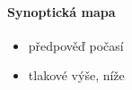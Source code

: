 \paragraph{Synoptická mapa}
\begin{itemize}
\item předpověď počasí
\item tlakové výše, níže
\end{itemize}


